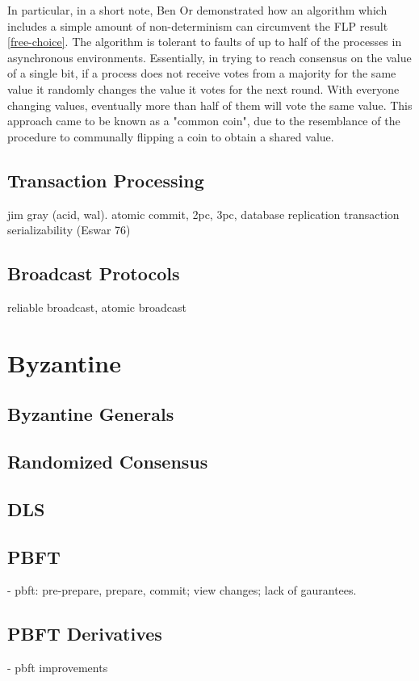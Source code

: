 In particular, in a short note, Ben Or demonstrated how an algorithm which includes a simple amount of non-determinism can circumvent the FLP result \ref{free-choice}.
The algorithm is tolerant to faults of up to half of the processes in asynchronous environments.
Essentially, in trying to reach consensus on the value of a single bit, 
if a process does not receive votes from a majority for the same value it randomly changes the value it votes for the next round.
With everyone changing values, eventually more than half of them will vote the same value.
This approach came to be known as a "common coin", 
due to the resemblance of the procedure to communally flipping a coin to obtain a shared value.

\subsection{}

\subsection{Transaction Processing}
jim gray (acid, wal). atomic commit, 2pc, 3pc, database replication
transaction serializability (Eswar 76)

\subsection{Broadcast Protocols}
reliable broadcast, atomic broadcast

\section{Byzantine}
	\subsection{Byzantine Generals}
	\subsection{Randomized Consensus}
	\subsection{DLS}
	\subsection{PBFT}
		- pbft: pre-prepare, prepare, commit; view changes; lack of gaurantees.
	\subsection{PBFT Derivatives} 
		- pbft improvements

